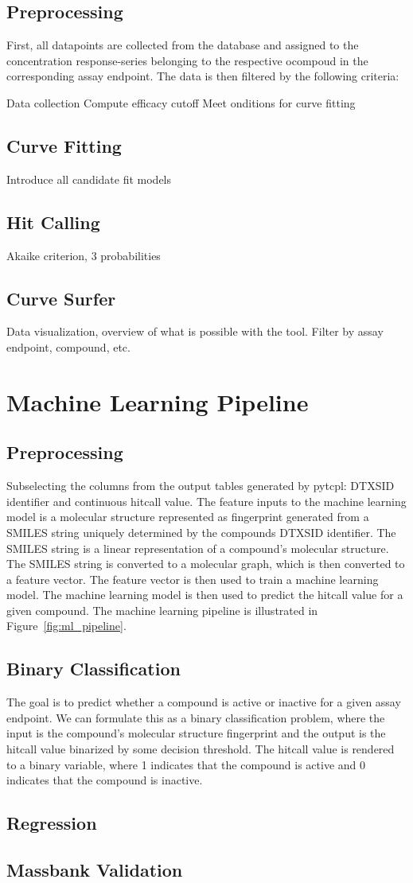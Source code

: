 \subsection{Preprocessing}
First, all datapoints are collected from the database and assigned to the concentration response-series belonging to the respective ocompoud in the corresponding assay endpoint. The data is then filtered by the following criteria:

Data collection
Compute efficacy cutoff
Meet onditions for curve fitting
\subsection{Curve Fitting}
Introduce all candidate fit models
\subsection{Hit Calling}
Akaike criterion, 3 probabilities 
\subsection{Curve Surfer}
Data visualization, overview of what is possible with the tool. Filter by assay endpoint, compound, etc.


\section{Machine Learning Pipeline}
\subsection{Preprocessing}
Subselecting the columns from the output tables generated by pytcpl: DTXSID identifier and continuous hitcall value. The feature inputs to the machine learning model is a molecular structure represented as fingerprint generated from a SMILES string uniquely determined by the compounds DTXSID identifier. The SMILES string is a linear representation of a compound's molecular structure. The SMILES string is converted to a molecular graph, which is then converted to a feature vector. The feature vector is then used to train a machine learning model. The machine learning model is then used to predict the hitcall value for a given compound. The machine learning pipeline is illustrated in Figure~\ref{fig:ml_pipeline}. 


\subsection{Binary Classification}
The goal is to predict whether a compound is active or inactive for a given assay endpoint. We can formulate this as a binary classification problem, where the input is the compound's molecular structure fingerprint and the output is the hitcall value binarized by some decision threshold. The hitcall value is rendered to a binary variable, where 1 indicates that the compound is active and 0 indicates that the compound is inactive.
\subsection{Regression}
\subsection{Massbank Validation}
